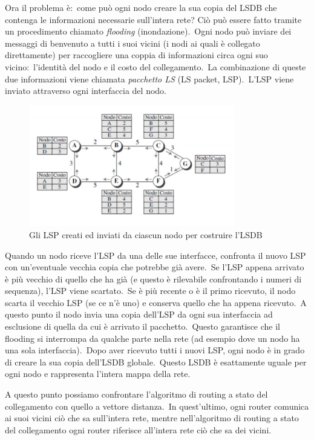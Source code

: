 Ora il problema è:\ come può ogni nodo creare la sua copia del LSDB che contenga le informazioni necessarie sull'intera rete? Ciò può essere fatto tramite un procedimento chiamato \emph{flooding} (inondazione).\
Ogni nodo può inviare dei messaggi di benvenuto a tutti i suoi vicini (i nodi ai quali è collegato direttamente) per raccogliere una coppia di informazioni circa ogni suo vicino:\ l'identità del nodo e il costo del collegamento.\
La combinazione di queste due informazioni viene chiamata \emph{pacchetto LS} (LS packet, LSP).\
L'LSP viene inviato attraverso ogni interfaccia del nodo.
\begin{figure}[H]
    \centering
    \includegraphics[width=0.8\textwidth]{immagini/LSPacket.jpg}
    \caption*{Gli LSP creati ed inviati da ciascun nodo per costruire l'LSDB}
\end{figure}
Quando un nodo riceve l'LSP da una delle sue interfacce, confronta il nuovo LSP con un'eventuale vecchia copia che potrebbe già avere.\
Se l'LSP appena arrivato è più vecchio di quello che ha già (e questo è rilevabile confrontando i numeri di sequenza), l'LSP viene scartato.\
Se è più recente o è il primo ricevuto, il nodo scarta il vecchio LSP (se ce n'è uno) e conserva quello che ha appena ricevuto.\
A questo punto il nodo invia una copia dell'LSP da ogni sua interfaccia ad esclusione di quella da cui è arrivato il pacchetto.\
Questo garantisce che il flooding si interrompa da qualche parte nella rete (ad esempio dove un nodo ha una sola interfaccia).\
Dopo aver ricevuto tutti i nuovi LSP, ogni nodo è in grado di creare la sua copia dell'LSDB globale.\
Questo LSDB è esattamente uguale per ogni nodo e rappresenta l'intera mappa della rete.

A questo punto possiamo confrontare l'algoritmo di routing a stato del collegamento con quello a vettore distanza.\
In quest'ultimo, ogni router comunica ai suoi vicini ciò che sa sull'intera rete, mentre nell'algoritmo di routing a stato del collegamento ogni router riferisce all'intera rete ciò che sa dei vicini.

